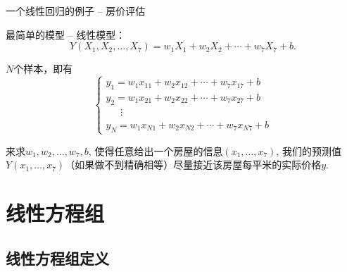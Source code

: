 \begin{frame}{一个线性回归的例子 -- 房价评估}

最简单的模型 -- 线性模型：
$$Y(X_1,X_2,\ldots,X_7) = w_1X_1 + w_2X_2 + \cdots + w_7X_7 + b.$$

\pause

$N$个样本，即有
$$
\begin{cases}
y_1 = w_1x_{11} + w_2x_{12} + \cdots + w_7x_{17} + b \\
y_2 = w_1x_{21} + w_2x_{22} + \cdots + w_7x_{27} + b \\
\phantom{yyy} \vdots \\
y_N = w_1x_{N1} + w_2x_{N2} + \cdots + w_7x_{N7} + b 
\end{cases}$$

\pause

来求$w_1,w_2,\ldots,w_7,b$, 使得任意给出一个房屋的信息$(x_1,\ldots,x_7)$, 我们的预测值$Y(x_1,\ldots,x_7)$（如果做不到精确相等）尽量接近该房屋每平米的实际价格$y$.

\end{frame}


\section{线性方程组} 

\subsection{线性方程组定义} 


